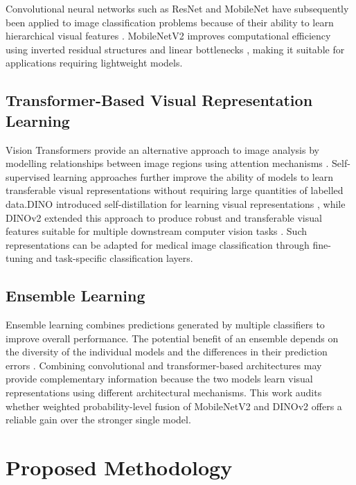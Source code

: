 \documentclass[3p,times,procedia]{elsarticle}
\begin{document}
Convolutional neural networks such as ResNet and MobileNet have subsequently been applied to image classification problems because of their ability to learn hierarchical visual features \cite{he2016,howard2017}. MobileNetV2 improves computational efficiency using inverted residual structures and linear bottlenecks \cite{sandler2018}, making it suitable for applications requiring lightweight models.

\subsection{Transformer-Based Visual Representation Learning}

Vision Transformers provide an alternative approach to image analysis by modelling relationships between image regions using attention mechanisms \cite{dosovitskiy2021}. Self-supervised learning approaches further improve the ability of models to learn transferable visual representations without requiring large quantities of labelled data.DINO introduced self-distillation for learning visual representations \cite{caron2021}, while DINOv2 extended this approach to produce robust and transferable visual features suitable for multiple downstream computer vision tasks \cite{oquab2024}. Such representations can be adapted for medical image classification through fine-tuning and task-specific classification layers.

\subsection{Ensemble Learning}

Ensemble learning combines predictions generated by multiple classifiers to improve overall performance. The potential benefit of an ensemble depends on the diversity of the individual models and the differences in their prediction errors \cite{kittler1998,dietterich2000}. Combining convolutional and transformer-based architectures may provide complementary information because the two models learn visual representations using different architectural mechanisms. This work audits whether weighted probability-level fusion of MobileNetV2 and DINOv2 offers a reliable gain over the stronger single model.

\section{Proposed Methodology}
\label{sec:methodology}
\end{document}
